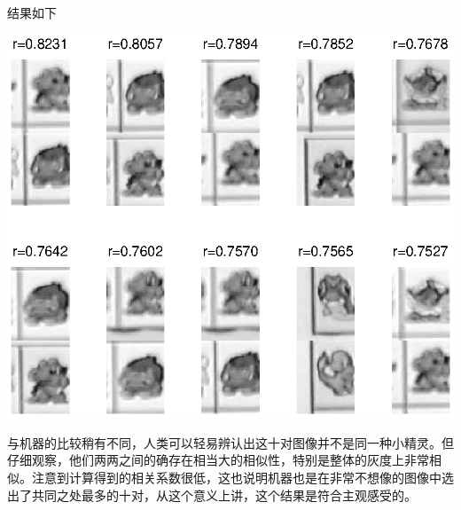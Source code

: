 \subsection{}
\noindent{}
\par 结果如下
\par \begin{center}\includegraphics[width=\textwidth]{A4_2_4.eps}\end{center}
\par 与机器的比较稍有不同，人类可以轻易辨认出这十对图像并不是同一种小精灵。但仔细观察，他们两两之间的确存在相当大的相似性，特别是整体的灰度上非常相似。注意到计算得到的相关系数很低，这也说明机器也是在非常不想像的图像中选出了共同之处最多的十对，从这个意义上讲，这个结果是符合主观感受的。

